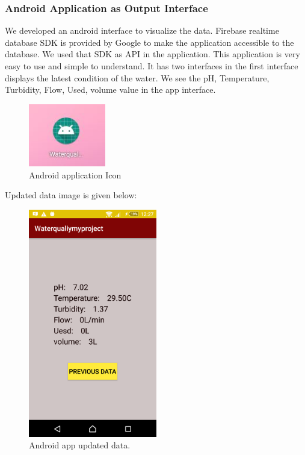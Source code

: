 \subsubsection*{Android Application as Output Interface}
We developed an android interface to visualize the data. Firebase realtime database SDK is provided by Google to make the application accessible to the database. We used that SDK as API in the application. This application is very easy to use and simple to understand. It has two interfaces in the first interface displays the latest condition of the water. We see the pH, Temperature, Turbidity, Flow, Used, volume value in the app interface. 
\begin{figure}[H]
\centering
\includegraphics[width=0.3\textwidth]{figures/application_icon.JPG}
\caption{Android application Icon}
\label{ICON}
\end{figure}

Updated data image is given below:

\begin{figure}[H]
\centering
\includegraphics[width=0.5\textwidth]{figures/171806466_876139099631416_6409685255133294248_n.png}
\caption{Android app updated data.}
\label{UpdateAndroid}
\end{figure}

